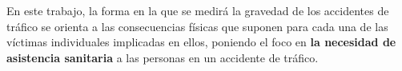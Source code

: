 \documentclass{uathesis-es}
\begin{document}
	
	En este trabajo, la forma en la que se medirá la gravedad de los accidentes de tráfico se orienta a las consecuencias físicas que suponen para cada una de las víctimas individuales implicadas en ellos, poniendo el foco en \textbf{la necesidad de asistencia sanitaria} a las personas en un accidente de tráfico.
	
	
	
	
	
\end{document}
